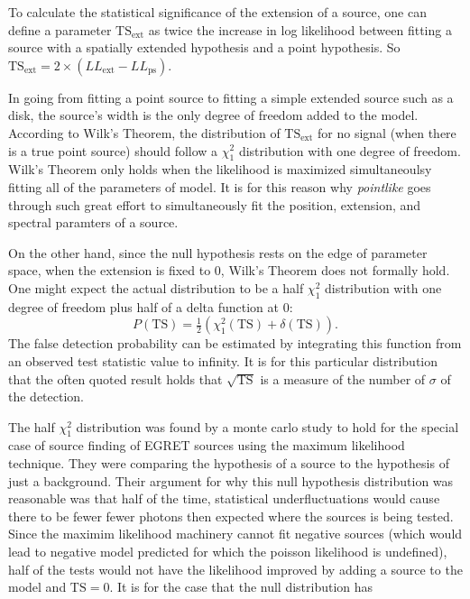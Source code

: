 \documentclass[preprint]{aastex}
\newcommand{\tsext}{\ensuremath{\text{TS}_\text{ext}}\xspace}
\newcommand{\ts}{\text{TS}\xspace}
\newcommand{\pointlike}{{\em pointlike}\xspace}
\begin{document}
To calculate the statistical significance of the extension of a source,
one can define a parameter $\tsext$ as twice the increase
in log likelihood between fitting a source with a
spatially extended hypothesis and a point hypothesis. 
So $\tsext=2\times(LL_\text{ext}-LL_\text{ps})$.

In going from fitting a point source to fitting a simple extended source such as
a disk, the source's width is the only degree of freedom added to the model. According to
Wilk's Theorem, the distribution of $\tsext$ for no signal (when there is a true
point source) should follow a $\chi^2_1$ distribution with one degree of freedom\cite{Wilks_Theorem}.
Wilk's Theorem only holds when the likelihood is maximized simultaneoulsy
fitting all of the parameters of model. It is for this reason why 
\pointlike
goes through such great effort to simultaneously fit the position, extension,
and spectral paramters of a source.

On the other hand, since the null hypothesis rests on the edge of
parameter space, when the extension is fixed to 0, Wilk's Theorem does
not formally hold\cite{Warnings about Wilk's Theorem Paper}.  One might
expect the actual distribution to be a half $\chi^2_1$ distribution with
one degree of freedom plus half of a delta function at 0:
\begin{equation}
  P(\ts)=\tfrac{1}{2}(\chi^2_1(\ts)+\delta(\ts)).
\end{equation}
The false detection probability can be estimated by integrating this function 
from an observed test statistic value to infinity. It is for this
particular distribution that the often quoted result holds that
$\sqrt{\ts}$ is a measure of the number of $\sigma$ of the detection.

The half $\chi^2_1$ distribution was found by a monte carlo study
to hold for the special case of source finding of EGRET sources using the
maximum likelihood technique.  They were comparing the hypothesis of a
source to the hypothesis of just a background\cite{Mattox_et_All_Paper}.
Their argument for why this null hypothesis distribution was reasonable
was that half of the time, statistical underfluctuations would cause
there to be fewer fewer photons then expected where the sources is being
tested. Since the maximim likelihood machinery cannot fit negative
sources (which would lead to negative model predicted for which the
poisson likelihood is undefined), half of the tests would not have the
likelihood improved by adding a source to the model and $\ts=0$.
It is for the case that the null distribution has 
\end{document}

